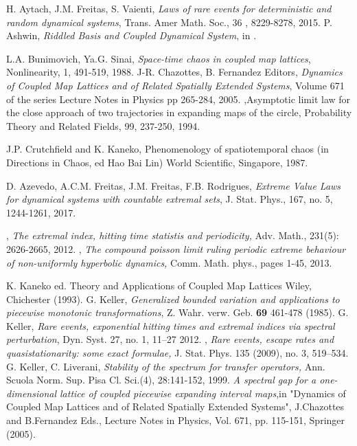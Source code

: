 \documentclass[12pt,reqno,a4paper]{amsart}
\begin{document}
 \begin{thebibliography}{PGB}
  {H. Aytach, J.M. Freitas, S. Vaienti}, \emph{Laws of rare events for deterministic and random dynamical systems}, Trans. Amer Math. Soc., 36
     , 8229-8278, 2015.
  {P. Ashwin}, \emph{Riddled Basis and Coupled Dynamical System}, in \cite{FC}.

 {L.A. Bunimovich, Ya.G. Sinai}, \emph{Space-time chaos in coupled map lattices}, Nonlinearity, 1, 491-519, 1988.
     {J-R. Chazottes, B. Fernandez Editors}, \emph{Dynamics of Coupled Map Lattices and of Related Spatially Extended Systems},
Volume 671 of the series Lecture Notes in Physics pp 265-284, 2005.
,{Asymptotic limit law for the close approach of two
trajectories in expanding maps of the circle}, Probability Theory and Related Fields, 99, 237-250, 1994.

   {J.P. Crutchfield and K. Kaneko}, Phenomenology of spatiotemporal chaos (in Directions in Chaos, ed Hao Bai Lin) World Scientific, Singapore, 1987.




   {D. Azevedo, A.C.M. Freitas, J.M. Freitas, F.B. Rodrigues}, \emph{ Extreme Value Laws for dynamical systems with countable extremal sets}, J. Stat. Phys., 167, no. 5, 1244-1261, 2017.




      	,
      	\emph{The extremal index, hitting time statistis and periodicity,}
      	Adv. Math., 231(5): 2626-2665, 2012.
      	,
      	\emph{The compound poisson limit ruling periodic extreme behaviour of non-uniformly hyperbolic dynamics,}
      	Comm. Math. phys., pages 1-45, 2013.

 {K. Kaneko ed.}  Theory and Applications of Coupled Map Lattices Wiley, Chichester (1993).
       {G. Keller}, {\em Generalized bounded variation and applications to piecewise monotonic transformations},  Z. Wahr. verw. Geb.
{\bf 69} 461-478 (1985).	
       {G. Keller}, \emph{Rare events, exponential hitting times and extremal indices via spectral
perturbation}, Dyn. Syst. 27, no. 1, 11–27 2012.
      	,
      	\emph{Rare events, escape rates and quasistationarity:
      		some exact formulae,}
      	J. Stat. Phys. 135 (2009), no. 3, 519–534.
       {G. Keller, C. Liverani}, \emph{Stability of the spectrum for transfer operators,} Ann. Scuola Norm.
Sup. Pisa Cl. Sci.(4), 28:141-152, 1999.
 {\em A spectral gap for a one-dimensional lattice of coupled piecewise expanding interval maps},in "Dynamics of Coupled Map Lattices and of Related Spatially Extended Systems", J.Chazottes and B.Fernandez Eds., Lecture Notes in Physics, Vol. 671, pp. 115-151, Springer (2005).


\end{thebibliography}
\end{document}
